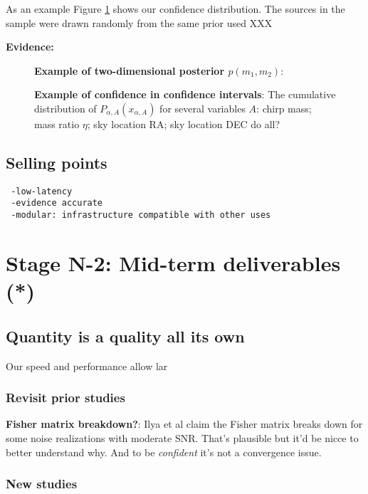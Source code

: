 \documentclass[twocolumn,prd,nofootinbib]{revtex4}
\newcommand\editremark[1]{{\color{red} #1}}
\begin{document}
As an example Figure \ref{fig:ShortTermDemo:OneDCumulativeInjectionRecovery} shows our confidence distribution.
The sources in the sample were drawn randomly from the same prior used \editremark{XXX}

\noindent \textbf{Evidence:}



\begin{figure}
\caption{\textbf{Example of two-dimensional posterior $p(m_1,m_2)$}:
}
\end{figure}

\begin{figure}
\caption{\label{fig:ShortTermDemo:OneDCumulativeInjectionRecovery}\textbf{Example of confidence in confidence
    intervals}: The cumulative distribution of $P_{\alpha,A}(x_{\alpha,A})$ for several variables $A$: chirp mass; mass
  ratio $\eta$; sky location RA; sky location DEC \editremark{do all?}
}
\end{figure}

\subsection{Selling points}

\begin{verbatim}
 -low-latency
 -evidence accurate
 -modular: infrastructure compatible with other uses
\end{verbatim}



\section{Stage N-2: Mid-term deliverables  (*)}
\subsection{Quantity is a quality all its own}
Our speed and performance allow lar

\subsubsection{Revisit prior studies}

\noindent \textbf{Fisher matrix breakdown?}: Ilya et al claim the Fisher matrix breaks down for some noise realizations
with moderate SNR.  That's plausible but it'd be nicce to better understand why.  And to be \emph{confident} it's not a
convergence issue.

\subsubsection{New studies}
\end{document}
